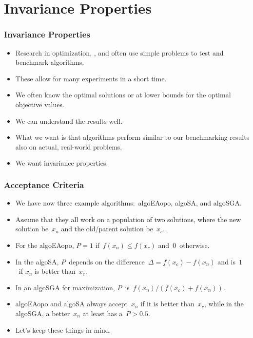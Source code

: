 \documentclass[aspectratio=169,mathserif,notheorems]{beamer}%
\begin{document}
\section{Invariance Properties}%
%
\begin{frame}%
\frametitle{Invariance Properties}%
\begin{itemize}%
\item Research in optimization, , and  often use simple problems to test and benchmark algorithms.%
\item<2-> These allow for many experiments in a short time.%
\item<3-> We often know the optimal solutions or at lower bounds for the optimal objective values.%
\item<4-> We can understand the results well.%
\item<5-> What we want is that algorithms perform similar to our benchmarking results also on actual, real-world problems.%
\item<6-> \alert{We want invariance properties.}\cite{OAAH2017IGOAAUPVIP,HA2014PDOCSSFTTP,JA2010LLCOTSIMMLEAOMFIRFLPS}%
\end{itemize}%
\end{frame}%
%
\begin{frame}%
\frametitle{Acceptance Criteria}%
\begin{itemize}%
\item We have now three example algorithms:~\gls{algoEAopo}, \gls{algoSA}, and \gls{algoSGA}.%
%
\item<2-> Assume that they all work on a population of two solutions, where the new solution be~$x_n$ and the old/parent solution be~$x_c$.%
%
\item<3-> For the \gls{algoEAopo}, $P=1$ if~$f(x_n)\leq f(x_c)$ and~$0$~otherwise.%
%
\item<4-> In the \gls{algoSA}, $P$~depends on the difference~$\Delta=f(x_c)-f(x_n)$ and is~$1$~if $x_n$ is better than~$x_c$.%
%
\item<5-> In an \gls{algoSGA} for maximization, $P$~is~$f(x_n)/(f(x_c)+f(x_n))$.%
%
\item<7-> \gls{algoEAopo} and \gls{algoSA} always accept~$x_n$ if it is better than~$x_c$, while in the \gls{algoSGA}, a better~$x_n$ at least has a~$P>0.5$.%
%
\item<8-> Let's keep these things in mind.%
\end{itemize}%
\end{frame}%
\end{document}
